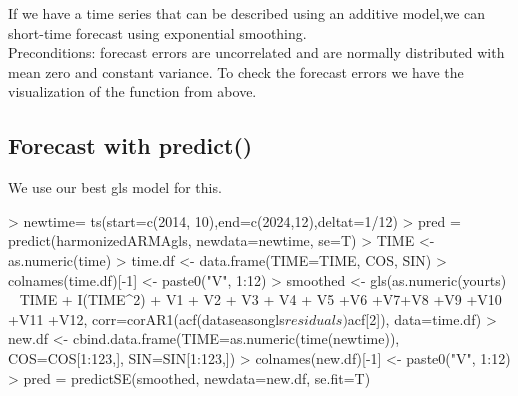 \documentclass[11pt, a4paper]{article} %
\begin{document}
If we have a time series that can be described using an additive model,we can short-time forecast using exponential smoothing.\\
Preconditions: forecast errors are uncorrelated and are normally distributed with mean zero and constant variance. To check the forecast errors we have the visualization of the function from above. 

\subsection{Forecast with predict()}
We use our best gls model for this. 
\begin{Schunk}
\begin{Sinput}
> newtime= ts(start=c(2014, 10),end=c(2024,12),deltat=1/12)
> pred = predict(harmonizedARMAgls, newdata=newtime, se=T) 
> TIME <- as.numeric(time)
> time.df <- data.frame(TIME=TIME, COS, SIN)
> colnames(time.df)[-1] <- paste0("V", 1:12)
> smoothed <- gls(as.numeric(yourts) ~ TIME + I(TIME^2) + V1 + V2 + V3 + V4 + V5 
                 +V6 +V7+V8 +V9 +V10 +V11 +V12, 
                 corr=corAR1(acf(dataseasongls$residuals)$acf[2]),
                 data=time.df)
> new.df <- cbind.data.frame(TIME=as.numeric(time(newtime)), 
                            COS=COS[1:123,], SIN=SIN[1:123,])
> colnames(new.df)[-1] <- paste0("V", 1:12)
> pred = predictSE(smoothed, newdata=new.df, se.fit=T)
\end{Sinput}
\end{Schunk}
\end{document}
